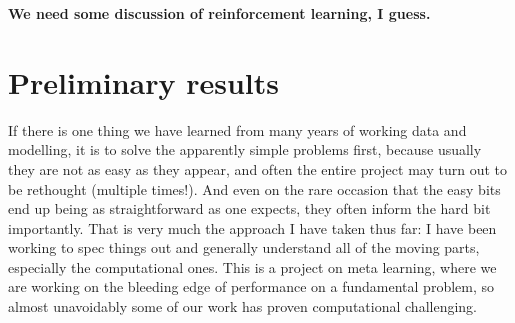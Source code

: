 \documentclass[10pt,twocolumn,letterpaper]{article}
\begin{document}
	

	 
	
	\textbf{We need some discussion of reinforcement learning, I guess.}

\section{Preliminary results}

If there is one thing we have learned from many years of working data and modelling, it is to solve the apparently simple problems first, because usually they are not as easy as they appear, and often the entire project may turn out to be rethought (multiple times!). 
	And even on the rare occasion that the easy bits end up being as straightforward as one expects, they often inform the hard bit importantly.
	That is very much the approach I have taken thus far: I have been working to spec things out and generally understand all of the moving parts, especially the computational ones. This is a project on meta learning, where we are working on the bleeding edge of performance on a fundamental problem, so almost unavoidably some of our work has proven computational challenging. 
\end{document}
